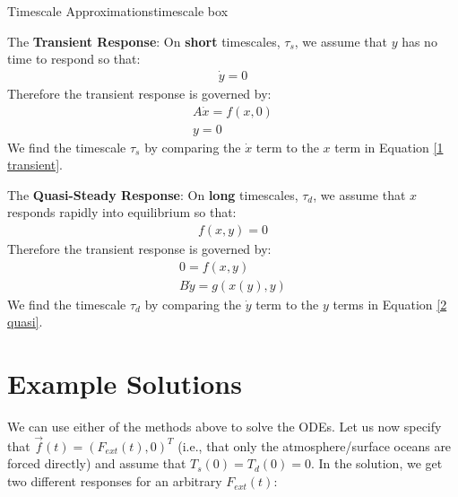 \begin{fact}{Timescale Approximations}{timescale box}
    \begin{minipage}{.5\linewidth}
        \begin{tcolorbox}[colback=myyellow!50!white,colframe=mymagenta]
            The \textbf{Transient Response}: On \textbf{short} timescales, $\tau_s$, we assume that $y$ has no time to respond so that:
            \begin{gather*}
                \dot{y}=0
            \end{gather*}
            Therefore the transient response is governed by:
            \begin{align}
                \label{1 transient}
                \boxed{A\dot{x}=f(x,0)}\\
                \boxed{y=0}
            \end{align}
            We find the timescale $\tau_s$ by comparing the $\dot{x}$ term to the $x$ term in Equation \ref{1 transient}.
        \end{tcolorbox}
    \end{minipage}
    \begin{minipage}{.5\linewidth}
        \begin{tcolorbox}[colback=myyellow!50!white,colframe=mymagenta]
            The \textbf{Quasi-Steady Response}: On \textbf{long} timescales, $\tau_d$, we assume that $x$ responds rapidly into equilibrium so that:
            \begin{gather*}
                f(x,y)=0
            \end{gather*}
            Therefore the transient response is governed by:
            \begin{align}
                \boxed{0=f(x,y)}\\
                \label{2 quasi}
                \boxed{B\dot{y}=g(x(y),y)}
            \end{align}
            We find the timescale $\tau_d$ by comparing the $\dot{y}$ term to the $y$ terms in Equation \ref{2 quasi}.
        \end{tcolorbox}
    \end{minipage}
\end{fact}

\section{Example Solutions}\label{Dynamical Systems Solutions}
We can use either of the methods above to solve the ODEs. Let us now specify that $\vec{f}(t)=(F_{ext}(t),0)^T$ (i.e., that only the atmosphere/surface oceans are forced directly) and assume that $T_s(0)=T_d(0)=0$. In the solution, we get two different responses for an arbitrary $F_{ext}(t)$:\vspace{5 mm}

